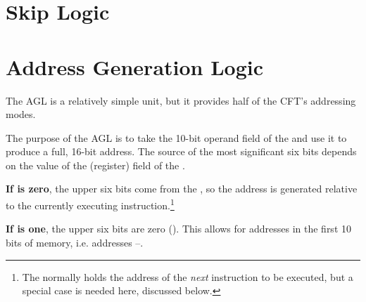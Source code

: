 







\section{Skip Logic}



\section{Address Generation Logic}

The \gls{AGL} is a relatively simple unit, but it provides half of the CFT's
addressing modes.

The purpose of the AGL is to take the 10-bit operand field of the \IR{} and use
it to produce a full, 16-bit address. The source of the most significant six
bits depends on the value of the  (register) field of the \IR.

\begin{description}
\item {\bfseries If  is zero}, the upper six bits come from the \PC, so
  the address is generated relative to the currently executing
  instruction.\footnote{The \PC{} normally holds the address of the {\em
      next\/} instruction to be executed, but a special case is needed here,
    discussed below.}
\item {\bfseries If  is one}, the upper six bits are zero
  (). This allows for addresses in the first 10 bits of memory,
  i.e. addresses –.
\end{description}

